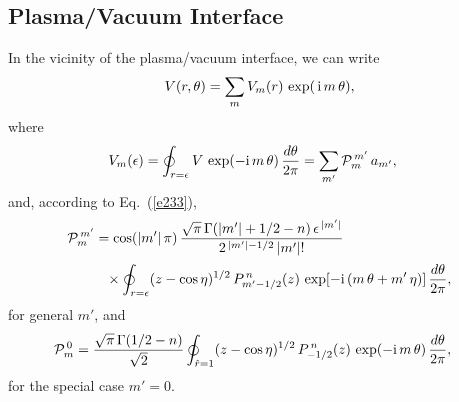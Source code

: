 \documentclass[12pt,prb,aps]{revtex4-1}
\begin{document}
\subsection{Plasma/Vacuum Interface}
In the vicinity of the plasma/vacuum interface, we can write
\begin{equation}\label{e193tt}
V(r,\theta) = \sum_m V_m(r)\,\exp(\,{\rm i}\,m\,\theta),
\end{equation}
where
\begin{align}\label{e344}
V_m (\epsilon)&= \oint_{r=\epsilon}V\,\exp(-{\rm i}\,m\,\theta)\,\frac{d\theta}{2\pi}= \sum_{m'}{\cal P}_m^{\,m'}\,a_{m'},
\end{align}
and, according to Eq.~(\ref{e233}), 
\begin{align}
{\cal P}_m^{\,m'} &=
\cos(|m'|\,\pi)\,\frac{\sqrt{\pi}\,\Gamma(|m'|+1/2-n)\,\epsilon^{\,|m'|}}{2^{\,|m'|-1/2}\,|m'|!}\nonumber\\[0.5ex]
&\phantom{=}\times
\oint_{r=\epsilon}(z-\cos\eta)^{1/2}\,P_{m'-1/2}^{\,n}(z)\,\exp[-{\rm i}\,(m\,\theta+m'\,\eta)]\,\frac{d\theta}{2\pi},\label{e346}
\end{align}
for general $m'$, and 
\begin{align}
{\cal P}_m^{\,0} &=
\frac{\sqrt{\pi}\,\Gamma(1/2-n)}{\sqrt{2}}\oint_{\hat{r}=1}
(z-\cos\eta)^{1/2}\,P_{-1/2}^{\,n}(z)\,\exp(-{\rm i}\,m\,\theta)\,\frac{d\theta}{2\pi},\label{e348}
\end{align}
for the special case $m'=0$. 
\end{document}
